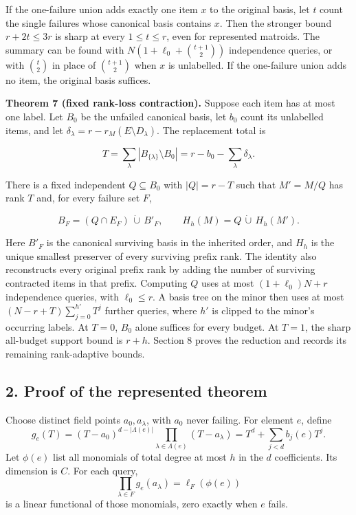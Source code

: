 If the one-failure union adds exactly one item \(x\) to the original basis, let \(t\) count the single failures whose canonical basis contains \(x\). Then the stronger bound \(r+2t\le3r\) is sharp at every \(1\le t\le r\), even for represented matroids. The summary can be found with \(N(1+\ell_0+\binom{t+1}{2})\) independence queries, or with \(\binom t2\) in place of \(\binom{t+1}{2}\) when \(x\) is unlabelled. If the one-failure union adds no item, the original basis suffices.

\textbf{Theorem 7 (fixed rank-loss contraction).} Suppose each item has at most one label. Let \(B_0\) be the unfailed canonical basis, let \(b_0\) count its unlabelled items, and let \(\delta_\lambda=r-r_M(E\setminus D_\lambda)\). The replacement total is

\[
T=\sum_\lambda |B_{\{\lambda\}}\setminus B_0|
 =r-b_0-\sum_\lambda\delta_\lambda.
\]

There is a fixed independent \(Q\subseteq B_0\) with \(|Q|=r-T\) such that \(M'=M/Q\) has rank \(T\) and, for every failure set \(F\),

\[
B_F=(Q\cap E_F)\,\dot\cup\,B'_F,
\qquad H_h(M)=Q\,\dot\cup\,H_h(M').
\]

Here \(B'_F\) is the canonical surviving basis in the inherited order, and \(H_h\) is the unique smallest preserver of every surviving prefix rank. The identity also reconstructs every original prefix rank by adding the number of surviving contracted items in that prefix. Computing \(Q\) uses at most \((1+\ell_0)N+r\) independence queries, with \(\ell_0\le r\). A basis tree on the minor then uses at most \((N-r+T)\sum_{j=0}^{h'}T^j\) further queries, where \(h'\) is clipped to the minor's occurring labels. At \(T=0\), \(B_0\) alone suffices for every budget. At \(T=1\), the sharp all-budget support bound is \(r+h\). Section 8 proves the reduction and records its remaining rank-adaptive bounds.

\hypertarget{af-240b5086c5-proof-of-the-represented-theorem}{%
\subsection{2. Proof of the represented theorem}\label{af-240b5086c5-proof-of-the-represented-theorem}}

Choose distinct field points \(a_0,a_\lambda\), with \(a_0\) never failing. For element \(e\), define \[
g_e(T)=(T-a_0)^{d-|\Lambda(e)|}\prod_{\lambda\in\Lambda(e)}(T-a_\lambda)
=T^d+\sum_{j<d}b_j(e)T^j.
\] Let \(\phi(e)\) list all monomials of total degree at most \(h\) in the \(d\) coefficients. Its dimension is \(C\). For each query, \[
\prod_{\lambda\in F}g_e(a_\lambda)=\ell_F(\phi(e))
\] is a linear functional of those monomials, zero exactly when \(e\) fails.

